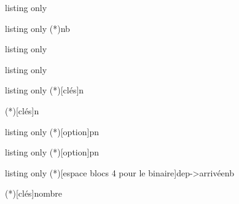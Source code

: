 \begin{PresCodeTexPL}{listing only}
\end{PresCodeTexPL}

\begin{PresCodeTexPL}{listing only}
\pfldecompnb(*){nb}
\end{PresCodeTexPL}

\begin{PresCodeTexPL}{listing only}
\pflarbrechoix
\end{PresCodeTexPL}

\begin{PresCodeTexPL}{listing only}
\pflarbrechoixssremise
\end{PresCodeTexPL}

\begin{PresCodeTexPL}{listing only}
\Factorielle(*)[clés]{n}
\pflfacto

\Primorielle(*)[clés]{n}
\pflprimor
\end{PresCodeTexPL}

\begin{PresCodeTexPL}{listing only}
\Arrangement(*)[option]{p}{n}
\pflarrang
\end{PresCodeTexPL}

\begin{PresCodeTexPL}{listing only}
\Combinaison(*)[option]{p}{n}
\pflcombin
\end{PresCodeTexPL}

\begin{PresCodeTexPL}{listing only}
\ConversionEntreBases(*)[espace blocs 4 pour le binaire]{dep->arrivée}{nb}
\pflconvbases

\ConversionDecBin(*)[clés]{nombre}
\pflconvdecbin

\pflconvbinhex

\pflconvhexbin

\pflconvversdec

\pflconvdix

\pflconvdepuisdix
\end{PresCodeTexPL}

